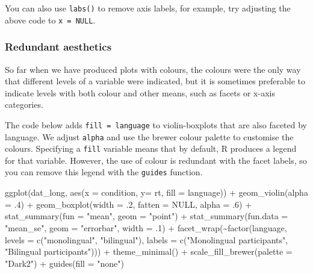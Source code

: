 \documentclass[
  english,
  doc,floatsintext]{apa6}
\newenvironment{Shaded}{\begin{snugshade}}{\end{snugshade}}
\newcommand{\AttributeTok}[1]{\textcolor[rgb]{0.77,0.63,0.00}{#1}}
\newcommand{\ConstantTok}[1]{\textcolor[rgb]{0.00,0.00,0.00}{#1}}
\newcommand{\DecValTok}[1]{\textcolor[rgb]{0.00,0.00,0.81}{#1}}
\newcommand{\FunctionTok}[1]{\textcolor[rgb]{0.00,0.00,0.00}{#1}}
\newcommand{\NormalTok}[1]{#1}
\newcommand{\SpecialCharTok}[1]{\textcolor[rgb]{0.00,0.00,0.00}{#1}}
\newcommand{\StringTok}[1]{\textcolor[rgb]{0.31,0.60,0.02}{#1}}
\begin{document}
You can also use \texttt{labs()} to remove axis labels, for example, try adjusting the above code to \texttt{x\ =\ NULL}.

\hypertarget{redundant-aesthetics}{%
\subsubsection{Redundant aesthetics}\label{redundant-aesthetics}}

So far when we have produced plots with colours, the colours were the only way that different levels of a variable were indicated, but it is sometimes preferable to indicate levels with both colour and other means, such as facets or x-axis categories.

The code below adds \texttt{fill\ =\ language} to violin-boxplots that are also faceted by language. We adjust \texttt{alpha} and use the brewer colour palette to customise the colours. Specifying a \texttt{fill} variable means that by default, R produces a legend for that variable. However, the use of colour is redundant with the facet labels, so you can remove this legend with the \texttt{guides} function.

\begin{Shaded}
\begin{Highlighting}[]
\FunctionTok{ggplot}\NormalTok{(dat\_long, }\FunctionTok{aes}\NormalTok{(}\AttributeTok{x =}\NormalTok{ condition, }\AttributeTok{y=}\NormalTok{ rt, }\AttributeTok{fill =}\NormalTok{ language)) }\SpecialCharTok{+}
  \FunctionTok{geom\_violin}\NormalTok{(}\AttributeTok{alpha =}\NormalTok{ .}\DecValTok{4}\NormalTok{) }\SpecialCharTok{+}
  \FunctionTok{geom\_boxplot}\NormalTok{(}\AttributeTok{width =}\NormalTok{ .}\DecValTok{2}\NormalTok{, }\AttributeTok{fatten =} \ConstantTok{NULL}\NormalTok{, }\AttributeTok{alpha =}\NormalTok{ .}\DecValTok{6}\NormalTok{) }\SpecialCharTok{+}
  \FunctionTok{stat\_summary}\NormalTok{(}\AttributeTok{fun =} \StringTok{"mean"}\NormalTok{, }\AttributeTok{geom =} \StringTok{"point"}\NormalTok{) }\SpecialCharTok{+}
  \FunctionTok{stat\_summary}\NormalTok{(}\AttributeTok{fun.data =} \StringTok{"mean\_se"}\NormalTok{, }\AttributeTok{geom =} \StringTok{"errorbar"}\NormalTok{, }\AttributeTok{width =}\NormalTok{ .}\DecValTok{1}\NormalTok{) }\SpecialCharTok{+}
  \FunctionTok{facet\_wrap}\NormalTok{(}\SpecialCharTok{\textasciitilde{}}\FunctionTok{factor}\NormalTok{(language, }
                     \AttributeTok{levels =} \FunctionTok{c}\NormalTok{(}\StringTok{"monolingual"}\NormalTok{, }\StringTok{"bilingual"}\NormalTok{),}
                     \AttributeTok{labels =} \FunctionTok{c}\NormalTok{(}\StringTok{"Monolingual participants"}\NormalTok{, }
                                \StringTok{"Bilingual participants"}\NormalTok{))) }\SpecialCharTok{+}
  \FunctionTok{theme\_minimal}\NormalTok{() }\SpecialCharTok{+}
  \FunctionTok{scale\_fill\_brewer}\NormalTok{(}\AttributeTok{palette =} \StringTok{"Dark2"}\NormalTok{) }\SpecialCharTok{+}
  \FunctionTok{guides}\NormalTok{(}\AttributeTok{fill =} \StringTok{"none"}\NormalTok{)}
\end{Highlighting}
\end{Shaded}
\end{document}
